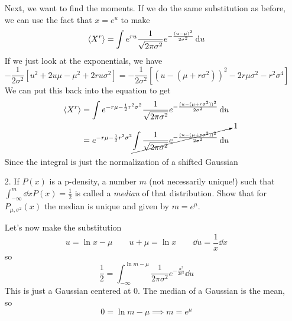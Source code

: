 \documentclass[a4paper,twoside]{article}
\begin{document}
\begin{itemize}
\begin{problem}
            Next, we want to find the moments. If we do the same substitution as before, we can use the fact that $ x = e^{u} $ to make
            \begin{equation}
                \ev{X^r} = \int e^{ru} \frac{1}{\sqrt{2 \pi \sigma^2}} e^{- \frac{(u - \mu)^2}{2 \sigma^2}} \dd{u}
            \end{equation}
            If we just look at the exponentials, we have
            \begin{equation}
                - \frac{1}{2 \sigma^2} \left[ u^2 + 2 u \mu - \mu^2 + 2 r u \sigma^2 \right] = - \frac{1}{2 \sigma^2} \left[ (u - (\mu + r \sigma^2))^2 - 2 r \mu \sigma^2 - r^2 \sigma^4 \right]
            \end{equation}
            We can put this back into the equation to get
            \begin{align}
                \ev{X^r} &= \int e^{- r \mu - \frac{1}{2}r^2 \sigma^2} \frac{1}{\sqrt{2 \pi \sigma^2}} e^{- \frac{(u - (\mu + r \sigma^2))^2}{2 \sigma^2}} \dd{u} \\
                &= e^{- r \mu - \frac{1}{2} r^2 \sigma^2} \cancelto{1}{\int \frac{1}{\sqrt{2 \pi \sigma^2}} e^{- \frac{(u - (\mu + r \sigma^2))^2}{2 \sigma^2}} \dd{u}}
            \end{align}
            Since the integral is just the normalization of a shifted Gaussian
        \end{problem}
    \item[2.] If $ P(x) $ is a p-density, a number $ m $ (not necessarily unique!) such that $ \int_{- \infty}^m \dd{x} P(x) = \frac{1}{2} $ is called a \textit{median} of that distribution. Show that for $ P_{\mu, \sigma^2}(x) $ the median is unique and given by $ m = e^{\mu} $.
        \begin{problem}
            Let's now make the substitution
            \begin{equation}
                u = \ln{x} - \mu \qquad u + \mu = \ln{x} \qquad \dd{u} = \frac{1}{x} \dd{x}
            \end{equation}
            so
            \begin{equation}
                \frac{1}{2} = \int_{- \infty}^{\ln{m} - \mu} \frac{1}{2 \pi \sigma^2} e^{- \frac{u^2}{2 \sigma^2}} \dd{u}
            \end{equation}
            This is just a Gaussian centered at $ 0 $. The median of a Gaussian is the mean, so
            \begin{equation}
                0 = \ln{m} - \mu \implies m = e^{\mu}

\end{equation}
\end{problem}
\end{itemize}
\end{document}
